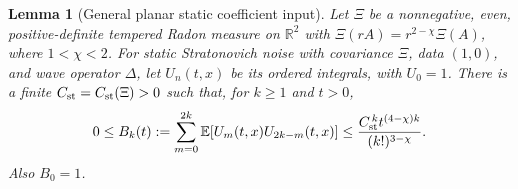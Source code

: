 \documentclass[12pt,oneside,openany]{book}
\numberwithin{equation}{section}
\newtheorem{lemma}[theorem]{Lemma}
\theoremstyle{nogostyle}
\theoremstyle{definition}
\newcommand{\R}{\mathbb{R}}
\newcommand{\E}{\mathbb{E}}
\begin{document}
\begin{lemma}[General planar static coefficient input]
  \label{L:planar-static-input}
  Let $\Xi$ be a nonnegative, even, positive-definite tempered Radon measure on
  $\R^2$ with $\Xi(rA) = r^{2-\chi}\Xi(A)$, where $1 < \chi < 2$. For static
  Stratonovich noise with covariance $\Xi$, data $(1,0)$, and wave operator
  $\Delta$, let $U_n(t,x)$ be its ordered integrals, with $U_0 = 1$. There is a
  finite $C_{\rm st} = C_{\rm st}(\Xi) > 0$ such that, for $k \ge 1$ and $t >
  0$,
  \begin{equation}\label{E:planar-static-input}
    0\le B_k(t):=\sum_{m=0}^{2k}\E[U_m(t,x)U_{2k-m}(t,x)]
    \le\frac{C_{\rm st}^{\,k}t^{(4-\chi)k}}{(k!)^{3-\chi}}.
  \end{equation}
  Also $B_0 = 1$.
\end{lemma}
\end{document}
